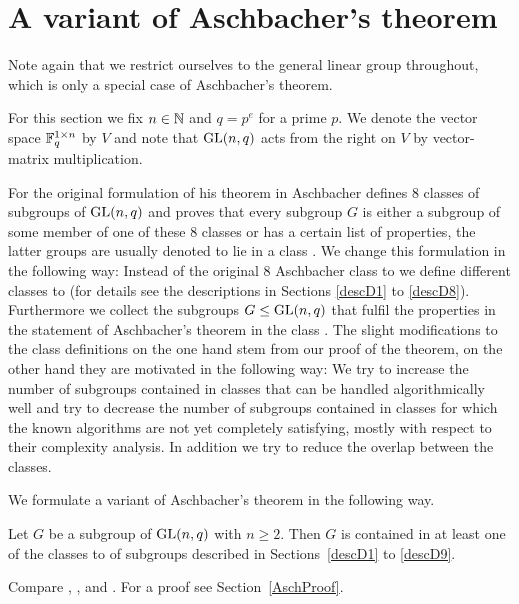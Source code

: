 \section{A variant of Aschbacher's theorem}
\label{sect:aschbacher}

Note again that we restrict ourselves to the general linear group
throughout, which is only a special case of Aschbacher's theorem.

\begin{Not}
For this section we fix $n \in \mathbb{N}$ and $q=p^e$ for a prime $p$.
We denote the vector space $\mathbb{F}_q^{1
\times n}$ by $V$ and note that $\GL(n,q)$ acts from the right on $V$ by
vector-matrix multiplication.
\end{Not}

For the original formulation of his theorem in \cite{aschbacher} Aschbacher 
defines $8$ classes
of subgroups of $\GL(n,q)$ and proves that every subgroup $G$ is either
a subgroup of some member of one of these $8$ classes or has a certain
list of properties, the latter groups are usually denoted to lie in
a class . We change this formulation in the following
way: Instead of the original 8 Aschbacher class  to 
we define different classes  to 
(for details see the descriptions in Sections \ref{descD1} to
\ref{descD8}).
Furthermore we collect
the subgroups $G \le \GL(n,q)$ that fulfil the properties in the statement of 
Aschbacher's theorem in the class . The slight modifications 
to the class definitions on the one hand stem from our proof of the
theorem, on the other hand they are motivated in the following way: We try
to increase the number of subgroups contained in classes that can be
handled algorithmically well and try to decrease the number of subgroups
contained in classes for which the known algorithms are not yet completely
satisfying, mostly with respect to their complexity analysis.
In addition we try to reduce the overlap between the classes.

We formulate a variant of Aschbacher's theorem in the following way.

\begin{Theo}
\label{Asch}
%
Let $G$ be a subgroup of\/ $\GL(n,q)$ with $n \ge 2$.
Then $G$ is contained in at least one of the
classes  to  of subgroups described in Sections~\ref{descD1}
to \ref{descD9}.
\end{Theo}
\proofbeg Compare \cite[Appendix 2, Theorem 1]{RobPhd}, \cite{aschbacher}, 
\cite{kleilieb} and 
\cite[Theorem~1]{smashprim}. For a proof see Section~\ref{AschProof}.
\proofend

